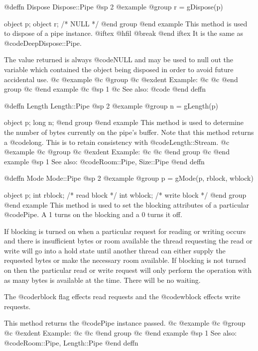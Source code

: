 @deffn {Dispose} Dispose::Pipe
@sp 2
@example
@group
r = gDispose(p)

object  p;
object  r;     /*  NULL  */
@end group
@end example
This method is used to dispose of a pipe instance.  
@iftex
@hfil @break 
@end iftex
It is the same as @code{DeepDispose::Pipe}.

The value returned is always @code{NULL} and may be used to null out
the variable which contained the object being disposed in order to
avoid future accidental use.
@c @example
@c @group
@c @exdent Example:
@c 
@c @end group
@c @end example
@c @sp 1
@c See also:  @code{}
@end deffn








@deffn {Length} Length::Pipe
@sp 2
@example
@group
n = gLength(p)

object  p;
long    n;
@end group
@end example
This method is used to determine the number of bytes currently on
the pipe's buffer.  Note that this method returns a @code{long}.
This is to retain consistency with @code{Length::Stream}.
@c @example
@c @group
@c @exdent Example:
@c 
@c @end group
@c @end example
@sp 1
See also:  @code{Room::Pipe, Size::Pipe}
@end deffn







@deffn {Mode} Mode::Pipe
@sp 2
@example
@group
p = gMode(p, rblock, wblock)

object  p;
int     rblock;   /*  read block   */
int     wblock;   /*  write block  */
@end group
@end example
This method is used to set the blocking attributes of a particular
@code{Pipe}.  A 1 turns on the blocking and a 0 turns it off.

If blocking is turned on when a particular request for reading or
writing occurs and there is insufficient bytes or room available
the thread requesting the read or write will go into a hold state
until another thread can either supply the requested bytes or
make the necessary room available.  If blocking is not turned on
then the particular read or write request will only perform the
operation with as many bytes is available at the time.  There
will be no waiting.

The @code{rblock} flag effects read requests and the @code{wblock}
effects write requests.

This method returns the @code{Pipe} instance passed.
@c @example
@c @group
@c @exdent Example:
@c 
@c @end group
@c @end example
@sp 1
See also:  @code{Room::Pipe, Length::Pipe}
@end deffn










